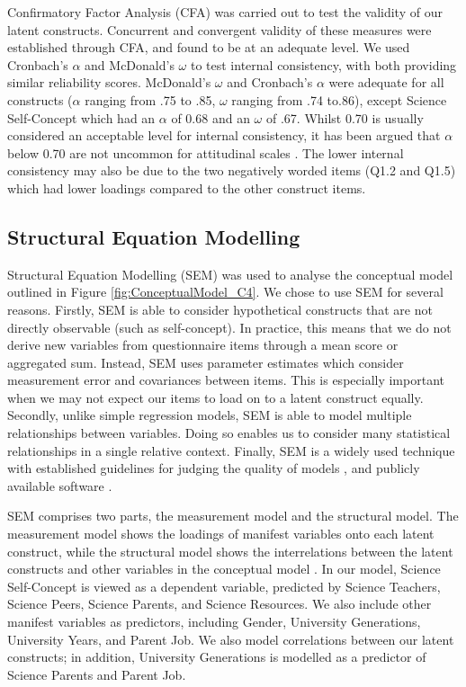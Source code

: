 Confirmatory Factor Analysis (CFA) was carried out to test the validity of our latent constructs. Concurrent and convergent validity \citep{campbell1959convergent} of these measures were established through CFA, and found to be at an adequate level. We used Cronbach's $\alpha$ and McDonald's $\omega$ to test internal consistency, with both providing similar reliability scores. McDonald's $\omega$ and Cronbach's $\alpha$ were adequate for all constructs ($\alpha$ ranging from .75 to .85, $\omega$ ranging from .74 to.86), except Science Self-Concept which had an $\alpha$ of 0.68 and an $\omega$ of .67. Whilst 0.70 is usually considered an acceptable level for internal consistency, it has been argued that $\alpha$ below 0.70 are not uncommon for attitudinal scales \citep{field2012discovering}. The lower internal consistency may also be due to the two negatively worded items (Q1.2 and Q1.5) which had lower loadings compared to the other construct items.

\subsection*{Structural Equation Modelling}
Structural Equation Modelling (SEM) was used to analyse the conceptual model outlined in Figure \ref{fig:ConceptualModel_C4}. We chose to use SEM for several reasons. Firstly, SEM is able to consider hypothetical constructs that are not directly observable (such as self-concept). In practice, this means that we do not derive new variables from questionnaire items through a mean score or aggregated sum. Instead, SEM uses parameter estimates which consider measurement error and covariances between items. This is especially important when we may not expect our items to load on to a latent construct equally. Secondly, unlike simple regression models, SEM is able to model multiple relationships between variables. Doing so enables us to consider many statistical relationships in a single relative context. Finally, SEM is a widely used technique with established guidelines for judging the quality of models \citep{schreiber2006reporting}, and publicly available software \citep[e.g.][]{rosseel2012lavaan}.

SEM comprises two parts, the measurement model and the structural model. The measurement model shows the loadings of manifest variables onto each latent construct, while the structural model shows the interrelations between the latent constructs and other variables in the conceptual model \citep{schreiber2006reporting}. In our model, Science Self-Concept is viewed as a dependent variable, predicted by Science Teachers, Science Peers, Science Parents, and Science Resources. We also include other manifest variables as predictors, including Gender, University Generations, University Years, and Parent Job. We also model correlations between our latent constructs; in addition, University Generations is modelled as a predictor of Science Parents and Parent Job.

